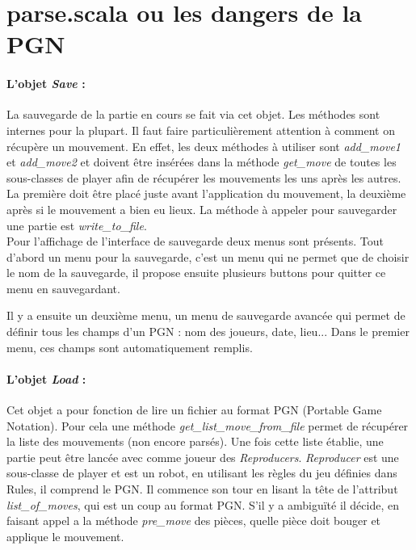 \documentclass[a4paper]{article}
\begin{document}
\section{parse.scala ou les dangers de la PGN}
\label{parse}

\paragraph{L'objet \textit{Save} :} La sauvegarde de la partie en cours se fait via cet objet. Les méthodes sont internes pour la plupart. Il faut faire particulièrement attention à comment on récupère un mouvement. En effet, les deux méthodes à utiliser sont \textit{add\_move1} et \textit{add\_move2} et doivent être insérées dans la méthode \textit{get\_move} de toutes les sous-classes de player afin de récupérer les mouvements les uns après les autres. La première doit être placé juste avant l'application du mouvement, la deuxième après si le mouvement a bien eu lieux. La méthode à appeler pour sauvegarder une partie est \textit{write\_to\_file}. \\

Pour l'affichage de l'interface de sauvegarde deux menus sont présents. Tout d'abord un menu pour la sauvegarde, c'est un menu qui ne permet que de choisir le nom de la sauvegarde, il propose ensuite plusieurs buttons pour quitter ce menu en sauvegardant. 

Il y a ensuite un deuxième menu, un menu de sauvegarde avancée qui permet de définir tous les champs d'un PGN : nom des joueurs, date, lieu... Dans le premier menu, ces champs sont automatiquement remplis.

\paragraph{L'objet \textit{Load} :} Cet objet a pour fonction de lire un fichier au format PGN (Portable Game Notation). Pour cela une méthode \textit{get\_list\_move\_from\_file} permet de récupérer la liste des mouvements (non encore parsés). Une fois cette liste établie, une partie peut être lancée avec comme joueur des \textit{Reproducers}. \textit{Reproducer} est une sous-classe de player et est un robot, en utilisant les règles du jeu définies dans Rules, il comprend le PGN. Il commence son tour en lisant la tête de l'attribut \textit{list\_of\_moves}, qui est un coup au format PGN. S'il y a ambiguïté il décide, en faisant appel a la méthode \textit{pre\_move} des pièces, quelle pièce doit bouger et applique le mouvement. \\
\end{document}

